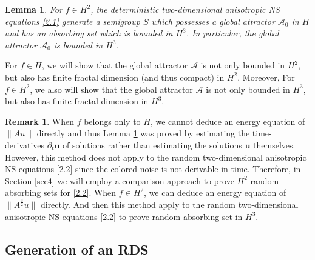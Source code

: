 \documentclass{elsarticle}
\newtheorem{lemma}[theorem]{Lemma}
\theoremstyle{definition}
\newtheorem{remark}[theorem]{Remark}
\numberwithin{equation}{section}
\newcommand{\A}{\mathcal{A}}
\begin{document}
\begin{lemma}\label{lem:det}
For $f\in H^2$, the deterministic two-dimensional anisotropic  NS equations \eqref{2.1}  generate a semigroup $S$ which possesses a global attractor $\A_0$ in $H$ and has an
  absorbing set which is bounded in $H^3$. In particular,    the global attractor $\A_0$   is   bounded in $H^3$.
\end{lemma}
For $f\in H$, we will show that the global attractor $\mathcal A$ is not only bounded in $H^2$, but also has   finite fractal dimension (and thus compact) in $H^2$. Moreover, For $f\in H^2$, we also will show that the global attractor $\mathcal A$ is not only bounded in $H^3$, but also has   finite fractal dimension in $H^3$.


\begin{remark}  \label{rmk1}
 When $f$ belongs only to $H$, we cannot deduce an energy equation of  $\|Au\|$ directly and thus Lemma \ref{lem:det} was proved by estimating the time-derivatives $ \partial_t \textbf{u} $  of solutions    rather than estimating the solutions  $\textbf{u}$ themselves.       However, this   method  does not apply to the  random two-dimensional anisotropic  NS equations \eqref{2.2}  since the colored noise is not derivable in time.  Therefore, in Section \ref{sec4} we will employ a comparison approach  to prove $H^2$ random absorbing sets for \eqref{2.2}.  When $f\in H^2$, we can deduce an energy equation of  $\|A^\frac32u\|$ directly. And then this   method apply to the  random two-dimensional anisotropic  NS equations \eqref{2.2} to prove random absorbing set in $H^3$.
\end{remark}





\subsection{Generation of an RDS}\label{sec2.1}
\end{document}
